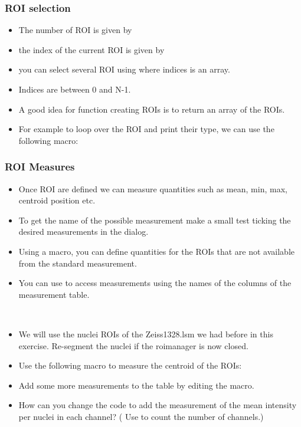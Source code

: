 \begin{frame}[fragile]
	\frametitle<presentation>{ROI selection}
	\begin{itemize}
		\item The number of ROI is given by 
		\item the index of the current ROI is given by 
		\item you can select several ROI using  where indices is an array.
		\item Indices are between 0 and N-1.
		\item A good idea for function creating ROIs is to return an array of the ROIs.
		\item For example to loop over the ROI and print their type, we
		can use the following macro:\par
		
	\end{itemize}
\end{frame}


\begin{frame}[fragile]
	\frametitle<presentation>{ROI Measures}
	\begin{itemize}
		\item Once ROI are defined we can measure quantities such as mean, min, max, centroid position etc.
		\item To get the name of the possible measurement make a small test ticking the desired measurements in the  dialog.
		\item Using a macro, you can define quantities for the ROIs that are not
		available from the standard measurement.
		\item You can use  to access measurements using the names
		of the columns of the measurement table.
	\end{itemize}
\end{frame}

\begin{frame}[fragile]
	\begin{example}[Measurements]~\par
		\begin{itemize}
			\item We will use the nuclei ROIs of the Zeiss1328.lsm we had before in this exercise. Re-segment the nuclei if the roimanager is now closed.
			\item Use the following macro to measure the centroid of the ROIs:\par
			
			\item Add some more measurements to the table by editing the macro.
			\item How can you change the code to add the measurement of the mean intensity per nuclei in each channel? ( Use  to count the number of channels.)
		\end{itemize}
	\end{example}
\end{frame}

